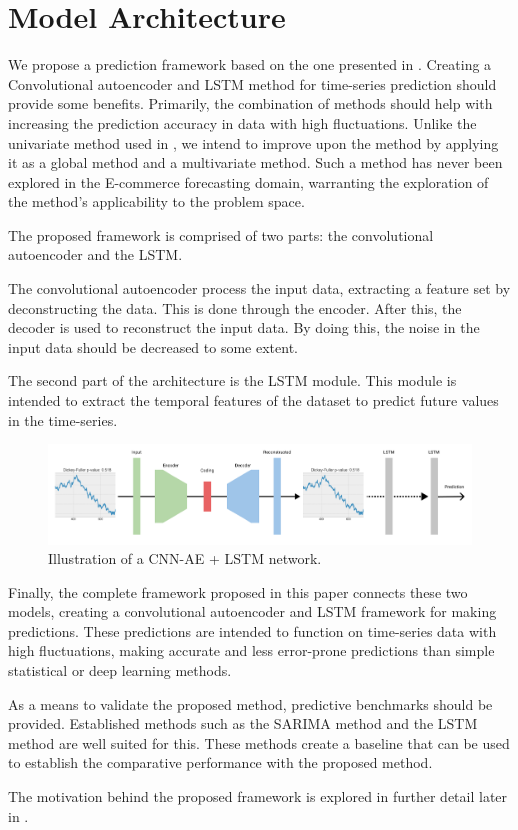 \section{Model Architecture}
\label{section:Architecture:Model}

We propose a prediction framework based on the one presented in \cite{Zhao2019}.
Creating a Convolutional autoencoder and LSTM method for time-series prediction should provide some benefits.
Primarily, the combination of methods should help with increasing the prediction accuracy in data with high fluctuations.
Unlike the univariate method used in \cite{Zhao2019}, we intend to improve upon the method by applying it as a global method and a multivariate method.
Such a method has never been explored in the E-commerce forecasting domain, warranting the exploration of the method's applicability to the problem space.

The proposed framework is comprised of two parts: the convolutional autoencoder and the LSTM.

The convolutional autoencoder process the input data, extracting a feature set by deconstructing the data.
This is done through the encoder. After this, the decoder is used to reconstruct the input data.
By doing this, the noise in the input data should be decreased to some extent.

The second part of the architecture is the LSTM module.
This module is intended to extract the temporal features of the dataset
to predict future values in the time-series.

\begin{figure}[h!]
  \centering
  \includegraphics[width=\textwidth]{./figs/illustrations/CNN-AE + LSTM.png}
  \hfill
  \caption{Illustration of a CNN-AE + LSTM network.}
  \label{fig:stacked_autoencoder_arch}
\end{figure}

Finally, the complete framework proposed in this paper connects these two models,
creating a convolutional autoencoder and LSTM framework for making predictions.
These predictions are intended to function on time-series data with high fluctuations,
making accurate and less error-prone predictions than simple statistical or deep learning methods.


As a means to validate the proposed method, predictive benchmarks should be provided.
Established methods such as the SARIMA method and the LSTM method are well suited for this.
These methods create a baseline that can be used to establish the comparative performance with the proposed method.

The motivation behind the proposed framework is explored in further detail later in .

